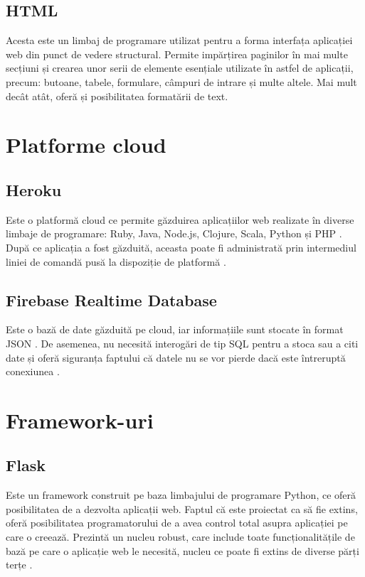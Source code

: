 \subsection{HTML}

	Acesta este un limbaj de programare utilizat pentru a forma interfața aplicației web din punct de vedere structural. Permite impărțirea paginilor în mai multe secțiuni și crearea unor serii de elemente esențiale utilizate în astfel de aplicații, precum: butoane, tabele, formulare, câmpuri de intrare și multe altele. Mai mult decât atât, oferă și posibilitatea formatării de text.  


\section{Platforme cloud}

\subsection{Heroku}

	Este o platformă cloud ce permite găzduirea aplicațiilor web realizate în diverse limbaje de programare: Ruby, Java, Node.js, Clojure, Scala, Python și PHP \cite{heroku}. După ce aplicația a fost găzduită, aceasta poate fi administrată prin intermediul liniei de comandă pusă la dispoziție de platformă \cite{heroku}.

\subsection{Firebase Realtime Database}

	Este o bază de date găzduită pe cloud, iar informațiile sunt stocate în format JSON \cite{firebase}. De asemenea, nu necesită interogări de tip SQL pentru a stoca sau a citi date și oferă siguranța faptului că datele nu se vor pierde dacă este întreruptă conexiunea \cite{firebase}.

\section{Framework-uri}

\subsection{Flask}

	Este un framework construit pe baza limbajului de programare Python, ce oferă posibilitatea de a dezvolta aplicații web. Faptul că este proiectat ca să fie extins, oferă posibilitatea programatorului de a avea control total asupra aplicației pe care o creează. Prezintă un nucleu robust, care include toate funcționalitățile de bază pe care o aplicație web le necesită, nucleu ce poate fi extins de diverse părți terțe \cite{flask}.

